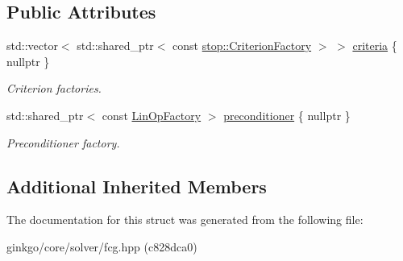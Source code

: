 \subsection*{Public Attributes}
\begin{DoxyCompactItemize}
\item 
\mbox{\label{structgko_1_1solver_1_1Fcg_1_1parameters__type_a4d322d51e9c1908b97a868746c191683}} 
std\+::vector$<$ std\+::shared\+\_\+ptr$<$ const \hyperlink{group__stop_gab12a51109c50b35ec36dc5a393d6a9a0}{stop\+::\+Criterion\+Factory} $>$ $>$ \hyperlink{structgko_1_1solver_1_1Fcg_1_1parameters__type_a4d322d51e9c1908b97a868746c191683}{criteria} \{ nullptr \}
\begin{DoxyCompactList}\small\item\em Criterion factories. \end{DoxyCompactList}\item 
\mbox{\label{structgko_1_1solver_1_1Fcg_1_1parameters__type_afbdb7787925ef4294b12fe6851cfafd4}} 
std\+::shared\+\_\+ptr$<$ const \hyperlink{classgko_1_1LinOpFactory}{Lin\+Op\+Factory} $>$ \hyperlink{structgko_1_1solver_1_1Fcg_1_1parameters__type_afbdb7787925ef4294b12fe6851cfafd4}{preconditioner} \{ nullptr \}
\begin{DoxyCompactList}\small\item\em Preconditioner factory. \end{DoxyCompactList}\end{DoxyCompactItemize}
\subsection*{Additional Inherited Members}


The documentation for this struct was generated from the following file\+:\begin{DoxyCompactItemize}
\item 
ginkgo/core/solver/fcg.\+hpp (c828dca0)\end{DoxyCompactItemize}
